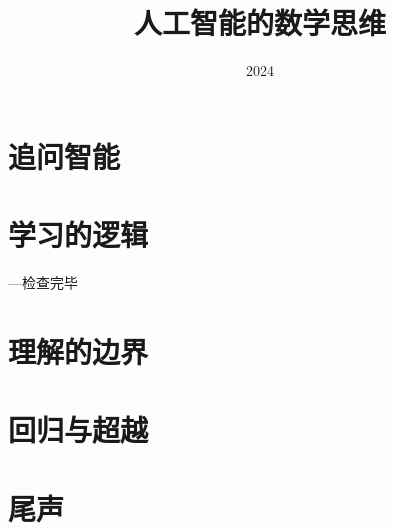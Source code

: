 \documentclass[lang=cn,scheme=chinese,12pt]{elegantbook}
\title{人工智能的数学思维}
\institute{华东师范大学 软件工程学院}
\date{2024}
\begin{document}
\maketitle

%

\frontmatter

\tableofcontents

\mainmatter

\part{追问智能}

\part{学习的逻辑}

 ---检查完毕 %
%

\part{理解的边界}

\part{回归与超越}


% 

\part{尾声}



%



\end{document}
